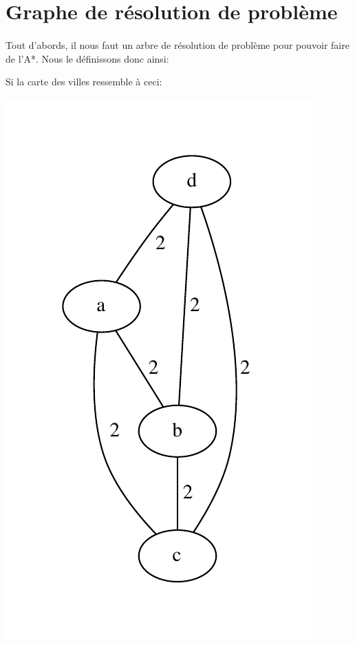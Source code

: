 \documentclass[french]{article}
\begin{document}
\section{Graphe de résolution de problème}

\paragraph{} Tout d'abords, il nous faut un arbre de résolution de problème
pour pouvoir faire de l'A*. Nous le définissons donc ainsi:

Si la carte des villes ressemble à ceci:
\begin{center}
\includegraphics[scale=0.5]{graphs/modeling-the-problem_example1-map.pdf}
\end{center}
\end{document}
